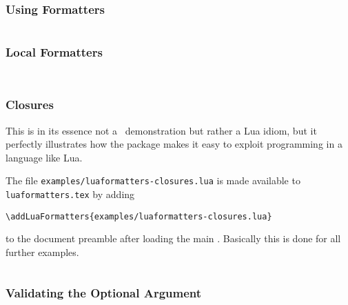 \documentclass[12pt]{scrartcl}
\begin{document}
\subsubsection{Using Formatters}
\label{sec:examples:using-formatters}

\inputminted{lua}{examples/luaformatters-format.lua}


\subsubsection{Local Formatters}
\label{sec:examples:local-formatters}

\inputminted{lua}{examples/luaformatters-local-formatters.lua}

\inputminted{tex}{examples/luaformatters-local-formatters.tex}


\subsubsection{Closures}
\label{sec:examples:closures}

This is in its essence not a \luaformatters\ demonstration but rather a Lua idiom, but it perfectly illustrates how the package makes it easy to exploit programming in a language like Lua.

The file \texttt{examples/luaformatters-closures.lua} is made available to \texttt{luaformatters.tex} by adding

\begin{verbatim}
\addLuaFormatters{examples/luaformatters-closures.lua}
\end{verbatim}

\noindent to the document preamble after loading the main .  Basically this is done for all further examples.

\inputminted{lua}{examples/luaformatters-closure.lua}


\subsubsection{Validating the Optional Argument}
\label{sec:examples:validating-optional-argument}

\inputminted{lua}{examples/luaformatters-validate-options.lua}

\inputminted{tex}{examples/luaformatters-validate-options.tex}
\end{document}
